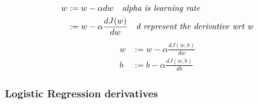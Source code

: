 

\begin{figure}[!t]
\subfigure[Derivative Example of function $f(x) = x^2$]{~\label{fig:Derivative_Example}
}
\subfigure[Derivative Example of function  $f(x) = x^2$ where $\alpha_1$ > $\alpha_2$]{\label{fig:Alpha_Change}
}
\end{figure}


\begin{equation}\label{eq:gredient_descent_w}
  \begin{split}
    w & := w - \alpha dw \quad \text{\textit{alpha is learning rate}}\\
      & := w - \alpha \frac{dJ(w)}{dw} \quad \text{\textit{d represent the derivative wrt w}}
  \end{split}
\end{equation}
%
\begin{subequations}
     \begin{align}
w& := w - \alpha \frac{dJ(w,b)}{dw} \label{eq:gradient_descent_j_w}\\
b& := b - \alpha \frac{dJ(w,b)}{db} \label{eq:gradient_descent_j_b}
     \end{align}
   \end{subequations}
   






  \subsubsection{Logistic Regression derivatives}\label{sec:Logistic_Bp_Derivatives}

